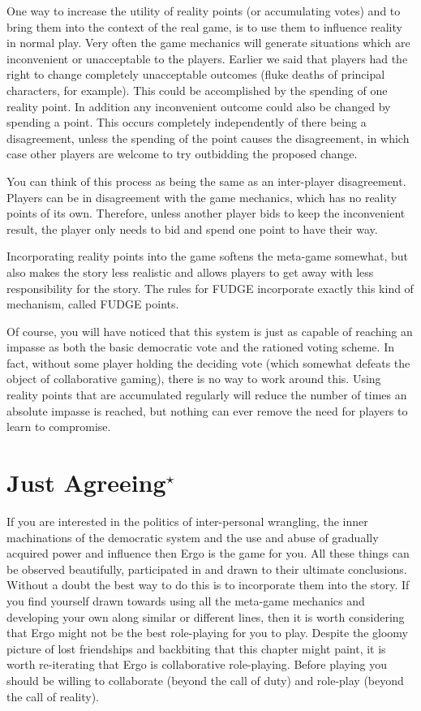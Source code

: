 \documentclass[twoside]{book}
\begin{document}
One way to increase the utility of reality points (or accumulating
votes) and to bring them into the context of the real game, is to use
them to influence reality in normal play. Very often the game
mechanics will generate situations which are inconvenient or
unacceptable to the players. Earlier we said that players had the
right to change completely unacceptable outcomes (fluke deaths of
principal characters, for example). This could be accomplished by the
spending of one reality point. In addition any inconvenient outcome
could also be changed by spending a point. This occurs completely
independently of there being a disagreement, unless the spending of
the point causes the disagreement, in which case other players are
welcome to try outbidding the proposed change.

You can think of this process as being the same as an inter-player
disagreement. Players can be in disagreement with the game mechanics,
which has no reality points of its own. Therefore, unless another
player bids to keep the inconvenient result, the player only needs to
bid and spend one point to have their way.

Incorporating reality points into the game softens the meta-game
somewhat, but also makes the story less realistic and allows players
to get away with less responsibility for the story. The rules for
FUDGE incorporate exactly this kind of mechanism, called FUDGE points.

Of course, you will have noticed that this system is just as capable
of reaching an impasse as both the basic democratic vote and the
rationed voting scheme. In fact, without some player holding the
deciding vote (which somewhat defeats the object of collaborative
gaming), there is no way to work around this. Using reality points
that are accumulated regularly will reduce the number of times an
absolute impasse is reached, but nothing can ever remove the need for
players to learn to compromise.

\section{Just Agreeing$^\star$} %

If you are interested in the politics of inter-personal wrangling, the
inner machinations of the democratic system and the use and abuse of
gradually acquired power and influence then Ergo is the game for
you. All these things can be observed beautifully, participated in and
drawn to their ultimate conclusions. Without a doubt the best way to
do this is to incorporate them into the story. If you find yourself
drawn towards using all the meta-game mechanics and developing your
own along similar or different lines, then it is worth considering
that Ergo might not be the best role-playing for you to play. Despite
the gloomy picture of lost friendships and backbiting that this
chapter might paint, it is worth re-iterating that Ergo is
collaborative role-playing. Before playing you should be willing to
collaborate (beyond the call of duty) and role-play (beyond the call
of reality).
\end{document}
